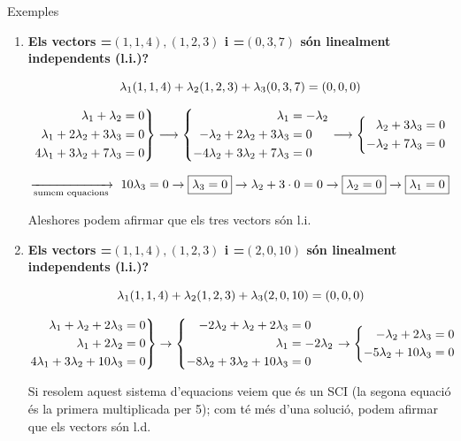\documentclass[11pt,a4paper]{article}
\newcommand{\fmm}[1]{\setbox0=\hbox{$#1$}\ifdim\wd0>\linewidth\fmdisp{#1}\else\mbox{\box0}\fi}
\newcommand{\fmdisp}[1]{\[\setbox2=\hbox{$\displaystyle #1$}\ifdim\wd2>\linewidth\resizebox{\linewidth}{!}{\box2}\else\box2\fi\]}
\begin{document}
\begin{fmex}{Exemples}
\begin{enumerate}[label=\textbf{\arabic*.},leftmargin=*]
\item \textbf{Els vectors \fmm{(1,1,4),(1,2,3)} i \fmm{(0,3,7)} són linealment independents (l.i.)?}

\fmdisp{\lambda_1(1,1,4)+\lambda_2(1,2,3)+\lambda_3(0,3,7)=(0,0,0)}

\fmdisp{\left.\begin{aligned}\lambda_1+\lambda_2&=0\\ \lambda_1+2\lambda_2+3\lambda_3&=0\\ 4\lambda_1+3\lambda_2+7\lambda_3&=0\end{aligned}\right\}\longrightarrow\left\{\begin{aligned}\lambda_1&=-\lambda_2\\ -\lambda_2+2\lambda_2+3\lambda_3&=0\\ -4\lambda_2+3\lambda_2+7\lambda_3&=0\end{aligned}\right.\longrightarrow\left\{\begin{aligned}\lambda_2+3\lambda_3&=0\\ -\lambda_2+7\lambda_3&=0\end{aligned}\right.}

\fmdisp{\xrightarrow[\text{sumem equacions}]{}\ 10\lambda_3=0\rightarrow\boxed{\lambda_3=0}\rightarrow\lambda_2+3\cdot0=0\rightarrow\boxed{\lambda_2=0}\rightarrow\boxed{\lambda_1=0}}

Aleshores podem afirmar que els tres vectors són l.i.
\item \textbf{Els vectors \fmm{(1,1,4),(1,2,3)} i \fmm{(2,0,10)} són linealment independents (l.i.)?}

\fmdisp{\lambda_1(1,1,4)+\lambda_2(1,2,3)+\lambda_3(2,0,10)=(0,0,0)}

\fmdisp{\left.\begin{aligned}\lambda_1+\lambda_2+2\lambda_3&=0\\ \lambda_1+2\lambda_2&=0\\ 4\lambda_1+3\lambda_2+10\lambda_3&=0\end{aligned}\right\}\rightarrow\left\{\begin{aligned}-2\lambda_2+\lambda_2+2\lambda_3&=0\\ \lambda_1&=-2\lambda_2\\ -8\lambda_2+3\lambda_2+10\lambda_3&=0\end{aligned}\right.\rightarrow\left\{\begin{aligned}-\lambda_2+2\lambda_3&=0\\ -5\lambda_2+10\lambda_3&=0\end{aligned}\right.}

Si resolem aquest sistema d'equacions veiem que és un SCI (la segona equació és la primera multiplicada per 5); com té més d'una solució, podem afirmar que els vectors són l.d.
\end{enumerate}
\end{fmex}
\end{document}
